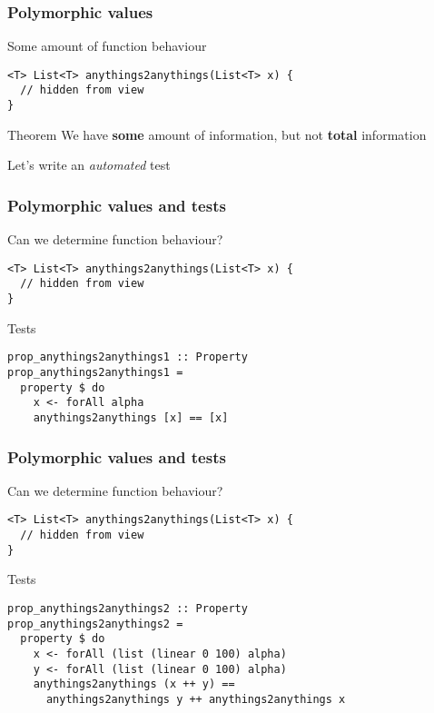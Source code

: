 \begin{frame}[fragile]
\frametitle{Polymorphic values}
\begin{block}{Some amount of function behaviour}
\begin{lstlisting}[style=java]
<T> List<T> anythings2anythings(List<T> x) {
  // hidden from view 
}
\end{lstlisting}
\end{block}
\begin{block}{Theorem}
We have \textbf{some} amount of information, but not \textbf{total} information

Let's write an \emph{automated} test
\end{block}
\end{frame}

\begin{frame}[fragile]
\frametitle{Polymorphic values and tests}
\begin{block}{Can we determine function behaviour?}
\begin{lstlisting}[style=java]
<T> List<T> anythings2anythings(List<T> x) {
  // hidden from view 
}
\end{lstlisting}
\end{block}
\begin{block}{Tests}
\begin{lstlisting}[style=haskell]
prop_anythings2anythings1 :: Property
prop_anythings2anythings1 =
  property $ do
    x <- forAll alpha
    anythings2anythings [x] == [x]
\end{lstlisting}
\end{block}
\end{frame}

\begin{frame}[fragile]
\frametitle{Polymorphic values and tests}
\begin{block}{Can we determine function behaviour?}
\begin{lstlisting}[style=java]
<T> List<T> anythings2anythings(List<T> x) {
  // hidden from view 
}
\end{lstlisting}
\end{block}
\begin{block}{Tests}
\begin{lstlisting}[style=haskell]
prop_anythings2anythings2 :: Property
prop_anythings2anythings2 =
  property $ do
    x <- forAll (list (linear 0 100) alpha)
    y <- forAll (list (linear 0 100) alpha)
    anythings2anythings (x ++ y) ==
      anythings2anythings y ++ anythings2anythings x
\end{lstlisting}
\end{block}
\end{frame}


